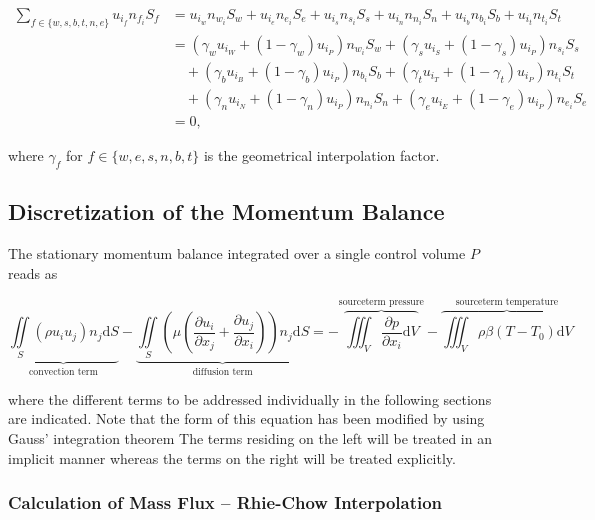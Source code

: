     \begin{align*}
      \sum_{f \in \{w,s,b,t,n,e\}} u_{i_f} n_{f_i} S_f 
      &= u_{i_w} n_{w_i} S_w + u_{i_e} n_{e_i} S_e 
       + u_{i_s} n_{s_i} S_s + u_{i_n} n_{n_i} S_n 
       + u_{i_b} n_{b_i} S_b + u_{i_t} n_{t_i} S_t  \\
      &= ( \gamma_w u_{i_W} + (1 - \gamma_w ) u_{i_P} ) n_{w_i} S_w + ( \gamma_s u_{i_S} + (1 - \gamma_s ) u_{i_P} ) n_{s_i} S_s \\
      &\quad + ( \gamma_b u_{i_B} + (1 - \gamma_b ) u_{i_P} ) n_{b_i} S_b + ( \gamma_t u_{i_T} + (1 - \gamma_t ) u_{i_P} ) n_{t_i} S_t \\
      &\quad + ( \gamma_n u_{i_N} + (1 - \gamma_n ) u_{i_P} ) n_{n_i} S_n + ( \gamma_e u_{i_E} + (1 - \gamma_e ) u_{i_P} ) n_{e_i} S_e \\
      & =  0,
    \end{align*}

    where \( \gamma_f \) for \( f \in \{w,e,s,n,b,t\} \) is the geometrical interpolation factor.

    \subsection{Discretization of the Momentum Balance}

      The stationary momentum balance integrated over a single control volume \(P\) reads as

      \begin{displaymath}
        \underbrace{\iint\limits_S (\rho u_i u_j)n_j \mathrm{d}S}_{\text{convection term}}
        - \underbrace{\iint\limits_S \left(\mu \left( \frac{\partial u_i}{\partial x_j} + \frac{\partial u_j}{\partial x_i}\right)\right)n_j \mathrm{d}S}_{\text{diffusion term}}
        = - \overbrace{\iiint_V \frac{\partial p}{\partial x_i} \mathrm{d}V}^{\text{sourceterm pressure}}
        - \overbrace{\iiint_V \rho \beta \left(T - T_0\right) \mathrm{d}V}^{\text{sourceterm temperature}}
      \end{displaymath}

      where the different terms to be addressed individually in the following sections are indicated. Note that the form of this equation has been modified by using Gauss' integration theorem The terms residing on the left will be treated in an implicit manner whereas the terms on the right will be treated explicitly. 

      \subsubsection{Calculation of Mass Flux -- Rhie-Chow Interpolation}

